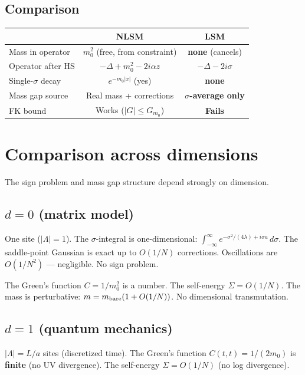\documentclass[12pt]{article}
\theoremstyle{definition}
\theoremstyle{remark}
\newcommand{\La}{\Lambda}
\begin{document}
\subsection{Comparison}

\begin{center}
\begin{tabular}{|l|c|c|}
\hline
& NLSM & LSM \\
\hline
Mass in operator & $m_0^2$ (free, from constraint) & \textbf{none} (cancels) \\
Operator after HS & $-\Delta+m_0^2-2i\alpha z$ & $-\Delta-2i\sigma$ \\
Single-$\sigma$ decay & $e^{-m_0|x|}$ (yes) & \textbf{none} \\
Mass gap source & Real mass + corrections & \textbf{$\sigma$-average only} \\
FK bound & Works ($|G| \le G_{m_0}$) & \textbf{Fails} \\
\hline
\end{tabular}
\end{center}

\section{Comparison across dimensions}

The sign problem and mass gap structure depend strongly on dimension.

\subsection{$d = 0$ (matrix model)}

One site ($|\La|=1$). The $\sigma$-integral is one-dimensional:
$\int_{-\infty}^\infty e^{-\sigma^2/(4\lambda)+i\sigma a}\,d\sigma$.
The saddle-point Gaussian is exact up to $O(1/N)$ corrections.
Oscillations are $O(1/N^2)$ --- negligible. No sign problem.

The Green's function $C = 1/m_0^2$ is a number. The self-energy
$\Sigma = O(1/N)$. The mass is perturbative: $m = m_{\rm bare}(1+O(1/N))$.
No dimensional transmutation.

\subsection{$d = 1$ (quantum mechanics)}

$|\La| = L/a$ sites (discretized time). The Green's function
$C(t,t) = 1/(2m_0)$ is \textbf{finite} (no UV divergence).
The self-energy $\Sigma = O(1/N)$ (no log divergence).
\end{document}
